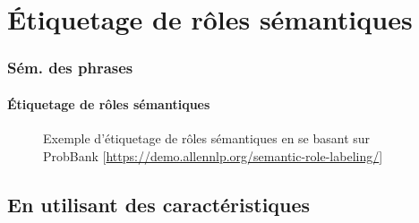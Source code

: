 \documentclass[xcolor=table]{beamer}
\begin{document}
%
%	
%	

\section{Étiquetage de rôles sémantiques}

\begin{frame}
\frametitle{Sém. des phrases}
\framesubtitle{Étiquetage de rôles sémantiques}

\begin{figure}
	\caption{Exemple d'étiquetage de rôles sémantiques en se basant sur ProbBank [\url{https://demo.allennlp.org/semantic-role-labeling/}]}
\end{figure}
	
\end{frame}

\subsection{En utilisant des caractéristiques}
\end{document}
